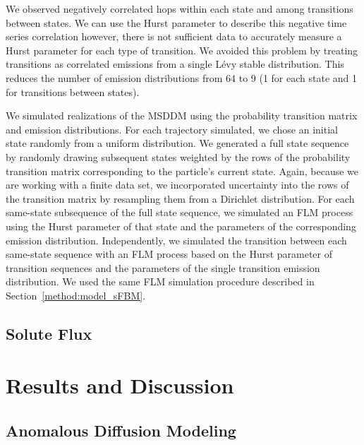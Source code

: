 \documentclass{article}
\begin{document}
  We observed negatively correlated hops within each state and among transitions between
  states. We can use the Hurst parameter to describe this negative time series correlation
  however, there is not sufficient data to accurately measure a Hurst parameter for 
  each type of transition. We avoided this problem by treating transitions as correlated
  emissions from a single L\'evy stable distribution. This reduces the number of emission
  distributions from 64 to 9 (1 for each state and 1 for transitions between states).
  
  We simulated realizations of the MSDDM using the probability transition matrix and 
  emission distributions. For each trajectory simulated, we chose an initial state
  randomly from a uniform distribution. We generated a full state sequence by randomly
  drawing subsequent states weighted by the rows of the probability transition matrix
  corresponding to the particle's current state. Again, because we are working with a
  finite data set, we incorporated uncertainty into the rows of the transition matrix 
  by resampling them from a Dirichlet distribution. For each same-state subsequence of
  the full state sequence, we simulated an FLM process using the Hurst parameter of that
  state and the parameters of the corresponding emission distribution. Independently, 
  we simulated the transition between each same-state sequence with an FLM process 
  based on the Hurst parameter of transition sequences and the parameters of the 
  single transition emission distribution. We used the same FLM simulation procedure
  described in Section~\ref{method:model_sFBM}.


  \subsection{Solute Flux}
  
  

  \section{Results and Discussion}

  \subsection{Anomalous Diffusion Modeling}\label{section:sFBM}
\end{document}
